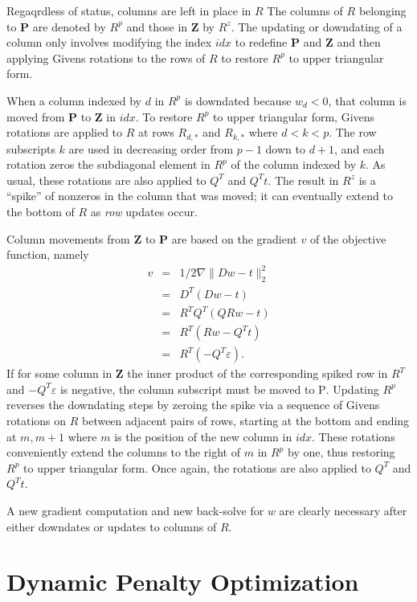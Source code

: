 Regaqrdless of status, columns are left in place in $R$
The columns of $R$ belonging to \textbf{P} are denoted by $R^p$ and those in \textbf{Z} by $R^z$.
The updating or downdating of a column only involves modifying the index $idx$ to redefine \textbf{P} and \textbf{Z} and then
applying Givens rotations to the rows of $R$ to restore $R^p$ to upper triangular form.

When a column indexed by $d$ in $R^p$ is downdated because $w_d < 0$, that column is moved from \textbf{P} to \textbf{Z} in $idx$.
To restore $R^p$ to upper triangular form, Givens rotations are applied to $R$ at rows $R_{d,*}$ and $R_{k,*}$
where $d < k < p$. The row subscripts $k$ are used in decreasing order from $p-1$ down to $d+1$,
and each rotation zeros the subdiagonal element in $R^p$ of the column indexed by $k$.
As usual, these rotations are also applied to $Q^T$ and $Q^Tt$.
The result in $R^z$ is a ``spike'' of nonzeros in the column that was moved;
it can eventually extend to the bottom of $R$ as \emph{row} updates occur.

Column movements from \textbf{Z} to \textbf{P} are based on the gradient $v$ of the objective function, namely
\begin{eqnarray*}
v &=& 1/2\nabla\|Dw - t\|^2_2 \\
  &=& D^T(Dw - t)             \\
  &=& R^TQ^T(QRw - t)         \\
  &=& R^T(Rw - Q^Tt)          \\
  &=& R^T(-Q^T\varepsilon).
\end{eqnarray*}
If for some column in \textbf{Z} the inner product of the corresponding spiked row in $R^T$ and $-Q^T\varepsilon$ is negative,
the column subscript must be moved to \textsc{P}.
Updating $R^p$ reverses the downdating steps by zeroing the spike via a sequence of Givens rotations on $R$
between adjacent pairs of rows, starting at the bottom and ending at $m,m+1$ where $m$ is the position of the new column in $idx$.
These rotations conveniently extend the columns to the right of $m$ in $R^p$ by one,
thus restoring $R^p$ to upper triangular form. Once again, the rotations are also applied to $Q^T$ and $Q^Tt$.

A new gradient computation and new back-solve for $w$ are clearly necessary after either downdates or updates to columns of $R$.



\section{Dynamic Penalty Optimization}\label{dyn_opt}

